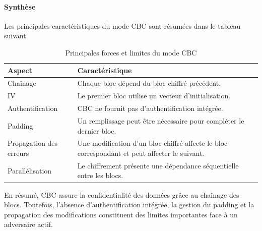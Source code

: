 \documentclass[12pt,a4paper]{article}
\begin{document}

\paragraph{Synthèse}

Les principales caractéristiques du mode CBC sont résumées dans le
tableau suivant.

\begin{table}[H]
\centering
\caption{Principales forces et limites du mode CBC}
\renewcommand{\arraystretch}{1.3}
\setlength{\tabcolsep}{6pt}

\begin{tabular}{|p{4.2cm}|p{9cm}|}
\hline
\textbf{Aspect} & \textbf{Caractéristique} \\
\hline

Chaînage &
Chaque bloc dépend du bloc chiffré précédent. \\
\hline

IV &
Le premier bloc utilise un vecteur d'initialisation. \\
\hline

Authentification &
CBC ne fournit pas d'authentification intégrée. \\
\hline

Padding &
Un remplissage peut être nécessaire pour compléter le dernier bloc. \\
\hline

Propagation des erreurs &
Une modification d'un bloc chiffré affecte le bloc correspondant et
peut affecter le suivant. \\
\hline

Parallélisation &
Le chiffrement présente une dépendance séquentielle entre les blocs. \\
\hline

\end{tabular}
\end{table}

En résumé, CBC assure la confidentialité des données grâce au
chaînage des blocs. Toutefois, l'absence d'authentification intégrée,
la gestion du padding et la propagation des modifications constituent
des limites importantes face à un adversaire actif.

\end{document}
